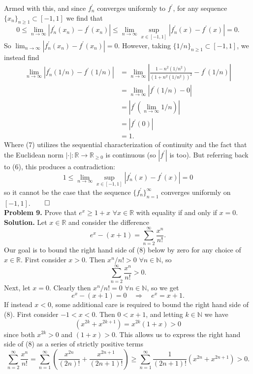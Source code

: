 \documentclass[11pt, letterpaper]{article}
\newcommand{\mbb}[1]{\mathbb{#1}}
\begin{document}
    Armed with this, and since $f^\prime_n$ converges uniformly to $f^\prime$, for any sequence $\{x_n\}_{n\geq 1}\subset[-1,1]$ we find that
    \[0\leq\lim_{n\rightarrow\infty}|f^\prime_n(x_n)-f^\prime(x_n)|\leq\lim_{n\rightarrow\infty}\sup_{x\in[-1,1]}|f^\prime_n(x)-f^\prime(x)|=0.\tag{6}\]
    So $\lim_{n\rightarrow\infty}|f^\prime_n(x_n)-f^\prime(x_n)|=0$. However, taking $\{1/n\}_{n\geq 1}\subset[-1,1]$, we instead find
    \begin{align*}
        \lim_{n\rightarrow\infty}|f^\prime_n(1/n)-f^\prime(1/n)|&=\lim_{n\rightarrow\infty}\left|\frac{1-n^2(1/n^2)}{(1+n^2(1/n^2))^2}-f^\prime(1/n)\right|\\
        &=\lim_{n\rightarrow\infty}\left|f^\prime(1/n)-0\right|\\
        &=|f^\prime(\lim_{n\rightarrow\infty}1/n)|\tag{7}\\
        &=|f^\prime(0)|\\
        &=1.
    \end{align*}
    Where (7) utilizes the sequential characterization of continuity and the fact that
    the Euclidean norm $|\cdot|:\mbb{R}\rightarrow\mbb{R}_{\geq 0}$ is continuous (so $|f^\prime|$ is too). But referring back to (6), this produces a contradiction:
    \[1\leq\lim_{n\rightarrow\infty}\sup_{x\in[-1,1]}|f^\prime_n(x)-f^\prime(x)|=0\]
    so it cannot be the case that the sequence $\{f_n^\prime\}_{n=1}^\infty$ converges uniformly on $[-1,1]$.\hfill{$\qed$}\\[10pt]
    {\bf Problem 9.} Prove that $e^x\geq 1+x$ $\forall x\in\mbb{R}$ with equality if and only if $x=0$.\\[10pt]
    {\bf Solution.} Let $x\in\mbb{R}$ and consider the difference
    \[e^x-(x+1)=\sum_{n=2}^\infty\frac{x^n}{n!}.\tag{8}\]
    Our goal is to bound the right hand side of (8) below by zero for any choice of $x\in\mbb{R}$. First consider $x>0$. Then $x^n/n!>0$ $\forall n\in\mbb{N}$, so
    \[\sum_{n=2}^\infty\frac{x^n}{n!}>0.\]
    Next, let $x=0$. Clearly then $x^n/n!=0$ $\forall n\in\mbb{N}$, so we get
    \[e^x-(x+1)=0\quad\Rightarrow\quad e^x=x+1.\]
    If instead $x<0$, some additional care is required to bound the right hand side of (8). First consider $-1<x<0$. Then $0<x+1$, and letting $k\in\mbb{N}$ we have
    \[(x^{2k}+x^{2k+1})=x^{2k}(1+x)>0\]
    since both $x^{2k}>0$ and $(1+x)>0$. This allows us to express the right hand side of (8) as a series of strictly positive terms
    \[\sum_{n=2}^\infty\frac{x^n}{n!}=\sum_{n=1}^\infty\left(\frac{x^{2n}}{(2n)!}+\frac{x^{2n+1}}{(2n+1)!}\right)\geq\sum_{n=1}^\infty\frac{1}{(2n+1)!}\left(x^{2n}+x^{2n+1}\right)>0.\]
\end{document}
